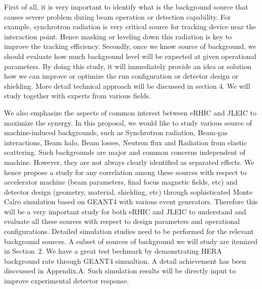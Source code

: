 First of all, it is very important to identify what is the background source that causes severe problem during beam operation
or detection capability. For example, synchrotron radiation is very critical source for tracking device near the interaction
point. Hence masking or leveling down this radiation is key to improve the tracking efficiency. Secondly, once we know source
of background, we should evaluate how much background level will be expected at given operational parameters. By doing this
study, it will immediately provide an idea or solution how we can improve or optimize the run configuration or detector design
or shielding. More detail technical approach will be discussed in section 4. We will study together with experts from various fields.


We also emphasize the aspects of common interest between eRHIC and JLEIC to maximize the synergy.
In this proposal, we would like to study various source of machine-induced backgrounds, such as Synchrotron radiation,
 Beam-gas interactions, Beam halo, Beam losses, Neutron flux and Radiation from elastic scattering. Such backgrounds
 are major and common concerns independent of machine. However, they are not always clearly identified as separated
 effects.  We hence propose a study for any correlation among these sources with respect to accelerator machine (beam parameters, final focus magnetic fields, etc) and
 detector design (geometry, material, shielding, etc) through sophisticated Monte Calro simulation based on GEANT4 with various event generators.
Therefore this will be a very important study for both eRHIC and JLEIC to understand and evaluate all these sources
with respect to design parameters and operational configurations.
Detailed simulation studies need to be performed for the relevant background sources.
A subset of sources of background we will study are itemized in Section~2.
We have a great test bechmark by demonstrating HERA background rate through GEANT4 simualtion. A detail achievement has been disccussed in Appendix.A.
Such simulation results will be directly input to improve experimental detector response.


